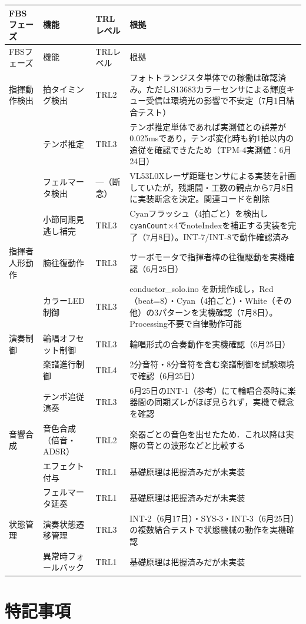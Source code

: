 \begingroup
\small
\begin{longtable}{p{3cm}p{4.5cm}p{1.8cm}p{6cm}}
\toprule
FBSフェーズ & 機能 & TRLレベル & 根拠 \\
\midrule
\endfirsthead

\toprule
FBSフェーズ & 機能 & TRLレベル & 根拠 \\
\midrule
\endhead

\bottomrule
\endfoot

指揮動作検出 & 拍タイミング検出 & TRL2 & フォトトランジスタ単体での稼働は確認済み。ただしS13683カラーセンサによる輝度キュー受信は環境光の影響で不安定（7月1日結合テスト）\\
 & テンポ推定 & TRL3 & テンポ推定単体であれば実測値との誤差が0.025msであり，テンポ変化時も約1拍以内の追従を確認できたため（TPM-4実測値：6月24日）\\
 & フェルマータ検出 & —（断念） & VL53L0Xレーザ距離センサによる実装を計画していたが，残期間・工数の観点から7月8日に実装断念を決定。関連コードを削除 \\
 & 小節同期見逃し補完 & TRL3 & Cyanフラッシュ（4拍ごと）を検出し\texttt{cyanCount}×4でnoteIndexを補正する実装を完了（7月8日）。INT-7/INT-8で動作確認済み \\
\midrule

指揮者人形動作 & 腕往復動作 & TRL3 & サーボモータで指揮者棒の往復駆動を実機確認（6月25日）\\
 & カラーLED制御 & TRL3 & conductor\_solo.ino を新規作成し，Red（beat=8）・Cyan（4拍ごと）・White（その他）の3パターンを実機確認（7月8日）。Processing不要で自律動作可能 \\
\midrule

演奏制御 & 輪唱オフセット制御 & TRL3 & 輪唱形式の合奏動作を実機確認（6月25日）\\
 & 楽譜進行制御 & TRL4 & 2分音符・8分音符を含む楽譜制御を試験環境で確認（6月25日）\\
 & テンポ追従演奏 & TRL3 & 6月25日のINT-1（参考）にて輪唱合奏時に楽器間の同期ズレがほぼ見られず，実機で概念を確認 \\
\midrule

音響合成 & 音色合成（倍音・ADSR） & TRL2 & 楽器ごとの音色を出せたため．これ以降は実際の音との波形などと比較する \\
 & エフェクト付与 & TRL1 & 基礎原理は把握済みだが未実装 \\
 & フェルマータ延奏 & TRL1 & 基礎原理は把握済みだが未実装 \\
\midrule

状態管理 & 演奏状態遷移管理 & TRL3 & INT-2（6月17日）・SYS-3・INT-3（6月25日）の複数結合テストで状態機械の動作を実機確認 \\
 & 異常時フォールバック & TRL1 & 基礎原理は把握済みだが未実装 \\

\end{longtable}
\endgroup

\section{特記事項}

